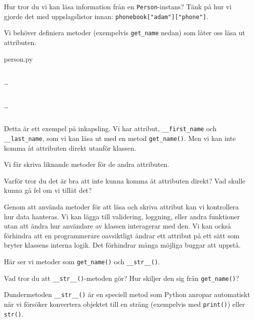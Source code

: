 \begin{exercise}
  Hur tror du vi kan läsa information från en 
  \texttt{Person}-instans?
  Tänk på hur vi gjorde det med uppslagslistor innan:
  \texttt{phonebook["adam"]["phone"]}.
\end{exercise}

Vi behöver definiera metoder (exempelvis \texttt{get_name} nedan) 
som låter oss läsa ut attributen.

\begin{frame}[fragile]
  person.py \hrulefill
  \inputminted[linenos,firstline=3,lastline=4]{python}{examples/person.py}
  \dots
  \inputminted[autogobble=false,linenos,firstline=17,lastline=23]{python}{examples/person.py}
  \dots
  \inputminted[autogobble=false,linenos,firstline=65,lastline=70]{python}{examples/person.py}
\end{frame}

Detta är ett exempel på inkapsling.
Vi har attribut,
\texttt{__first_name} och
\texttt{__last_name},
som vi kan läsa ut med en metod \texttt{get_name()}.
Men vi kan inte komma åt attributen direkt utanför klassen.

Vi får skriva liknande metoder för de andra attributen.

\begin{exercise}
  Varför tror du det är bra att inte kunna komma åt attributen direkt? Vad 
  skulle kunna gå fel om vi tillät det?
\end{exercise}

Genom att använda metoder för att läsa och skriva attribut kan vi kontrollera 
hur data hanteras. Vi kan lägga till validering, loggning, eller andra 
funktioner utan att ändra hur användare av klassen interagerar med den.
Vi kan också förhindra att en programmerare oavsiktligt ändrar ett attribut på 
ett sätt som bryter klassens interna logik.
Det förhindrar många möjliga buggar att uppstå.

Här ser vi metoder som \texttt{get_name()} och 
\texttt{__str__()}.

\begin{exercise}
  Vad tror du att \texttt{__str__()}-metoden gör?
  Hur skiljer den sig från \texttt{get_name()}?
\end{exercise}

Dundermetoden \texttt{__str__()} är en speciell metod som Python 
anropar automatiskt när vi försöker konvertera objektet till en sträng 
(exempelvis med \texttt{print()}) eller \texttt{str()}.

